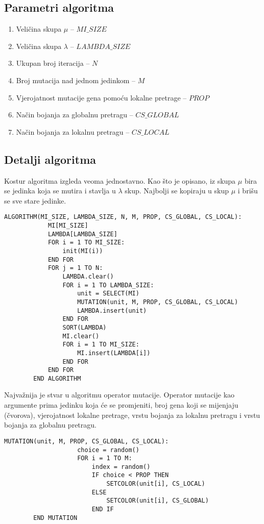 \documentclass[times, utf8, diplomski, numeric]{fer}
\begin{document}
\subsection{Parametri algoritma}

\begin{enumerate}
	\item Veličina skupa $\mu$ -- $MI\_SIZE$
	\item Veličina skupa $\lambda$ -- $LAMBDA\_SIZE$
	\item Ukupan broj iteracija -- $N$
	\item Broj mutacija nad jednom jedinkom -- $M$
	\item Vjerojatnost mutacije gena pomoću lokalne pretrage -- $PROP$
	\item Način bojanja za globalnu pretragu -- $CS\_GLOBAL$
	\item Način bojanja za lokalnu pretragu -- $CS\_LOCAL$
\end{enumerate}

\subsection{Detalji algoritma}

Kostur algoritma izgleda veoma jednostavno. Kao što je opisano, iz skupa $\mu$ bira se jedinka koja se mutira i stavlja u $\lambda$ skup. Najbolji se kopiraju u skup $\mu$ i brišu se sve stare jedinke. 

\begin{singlespace}
	\begin{lstlisting}[caption=Pseudok\^{o}d evolucijske strategije]
		ALGORITHM(MI_SIZE, LAMBDA_SIZE, N, M, PROP, CS_GLOBAL, CS_LOCAL):
			MI[MI_SIZE]
			LAMBDA[LAMBDA_SIZE]
			FOR i = 1 TO MI_SIZE:
				init(MI(i))
			END FOR
			FOR j = 1 TO N:
				LAMBDA.clear()
				FOR i = 1 TO LAMBDA_SIZE:
					unit = SELECT(MI)
					MUTATION(unit, M, PROP, CS_GLOBAL, CS_LOCAL)
					LAMBDA.insert(unit)
				END FOR
				SORT(LAMBDA)
				MI.clear()
				FOR i = 1 TO MI_SIZE:
					MI.insert(LAMBDA[i])
				END FOR
			END FOR
		END ALGORITHM
	\end{lstlisting}
\end{singlespace}

Najvažnija je stvar u algoritmu operator mutacije. Operator mutacije kao argumente prima jedinku koja će se promjeniti, broj gena koji se mijenjaju (čvorova), vjerojatnost lokalne pretrage, vrstu bojanja za lokalnu pretragu i vrstu bojanja za globalnu pretragu. 

\begin{singlespace}
	\begin{lstlisting}[caption=Pseudok\^{o}d mutacije evolucijske strategije]
		MUTATION(unit, M, PROP, CS_GLOBAL, CS_LOCAL):
					choice = random()
					FOR i = 1 TO M:
						index = random()
						IF choice < PROP THEN
							SETCOLOR(unit[i], CS_LOCAL)
						ELSE
							SETCOLOR(unit[i], CS_GLOBAL)
						END IF
		END MUTATION
	\end{lstlisting}
\end{singlespace}
\end{document}
